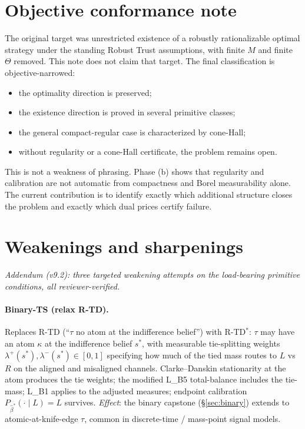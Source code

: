 \documentclass[11pt]{article}
\theoremstyle{definition}
\theoremstyle{remark}
\begin{document}
\section{Objective conformance note}\label{app:scope}

The original target was unrestricted existence of a robustly rationalizable optimal strategy under the standing Robust Trust assumptions, with finite $M$ and finite $\Theta$ removed. This note does not claim that target. The final classification is objective-narrowed:
\begin{itemize}[leftmargin=*]
  \item the optimality direction is preserved;
  \item the existence direction is proved in several primitive classes;
  \item the general compact-regular case is characterized by cone-Hall;
  \item without regularity or a cone-Hall certificate, the problem remains open.
\end{itemize}
This is not a weakness of phrasing. Phase (b) shows that regularity and calibration are not automatic from compactness and Borel measurability alone. The current contribution is to identify exactly which additional structure closes the problem and exactly which dual prices certify failure.

\section{Weakenings and sharpenings}\label{sec:weakenings}

\emph{Addendum (v9.2): three targeted weakening attempts on the
load-bearing primitive conditions, all reviewer-verified.}

\paragraph{Binary-TS (relax R-TD).}
Replaces R-TD (``$\tau$ no atom at the indifference belief'') with
R-TD$^*$: $\tau$ may have an atom $\kappa$ at the indifference belief
$s^*$, with measurable tie-splitting weights
$\lambda^+(s^*), \lambda^-(s^*) \in [0,1]$ specifying how much of the
tied mass routes to $L$ vs $R$ on the aligned and misaligned channels.
Clarke--Danskin stationarity at the atom produces the tie weights;
the modified L\_B5 total-balance includes the tie-mass; L\_B1 applies
to the adjusted measures; endpoint calibration
$P_{\hat\beta^*}(\cdot\mid L) = L$ survives.
\emph{Effect}: the binary capstone (\S\ref{sec:binary}) extends to
atomic-at-knife-edge $\tau$, common in discrete-time / mass-point
signal models.
\end{document}
